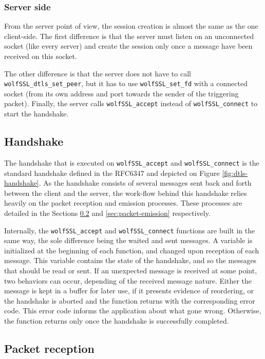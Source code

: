 \subsubsection{Server side}

From the server point of view, the session creation is almost the same as the one client-side. The first difference is that the server must listen on an unconnected socket (like every server) and create the session only once a message have been received on this socket.

The other difference is that the server does not have to call \texttt{wolfSSL\_dtls\_set\_peer}, but it has to use \texttt{wolfSSL\_set\_fd} with a connected socket (from its own address and port towards the sender of the triggering packet). Finally, the server calls \texttt{wolfSSL\_accept} instead of \texttt{wolfSSL\_connect} to start the handshake.

\subsection{Handshake}

The handshake that is executed on \texttt{wolfSSL\_accept} and \texttt{wolfSSL\_connect} is the standard handshake defined in the RFC6347\cite{rfc6347} and depicted on Figure \ref{fig:dtls-handshake}. As the handshake consists of several messages sent back and forth between the client and the server, the work-flow behind this handshake relies heavily on the packet reception and emission processes. These processes are detailed in the Sections \ref{sec:packet-reception} and \ref{sec:packet-emission} respectively.

Internally, the \texttt{wolfSSL\_accept} and \texttt{wolfSSL\_connect} functions are built in the same way, the sole difference being the waited and sent messages. A variable is initialized at the beginning of each function, and changed upon reception of each message. This variable contains the state of the handshake, and so the messages that should be read or sent. If an unexpected message is received at some point, two behaviors can occur, depending of the received message nature. Either the message is kept in a buffer for later use, if it presents evidence of reordering, or the handshake is aborted and the function returns with the corresponding error code. This error code informs the application about what gone wrong. Otherwise, the function returns only once the handshake is successfully completed.

\subsection{Packet reception}\label{sec:packet-reception}

